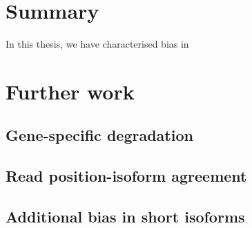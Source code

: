 
\section{Summary}

In this thesis, we have characterised bias in 


\section{Further work}

\subsection{Gene-specific degradation}

\subsection{Read position-isoform agreement}

\subsection{Additional bias in short isoforms}



